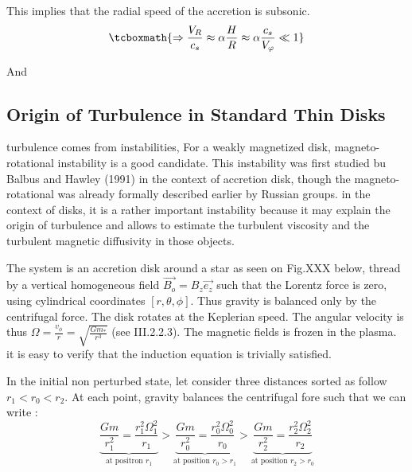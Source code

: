 \documentclass[10pt,a4paper,english]{article}
\begin{document}
This implies that the radial speed of the accretion is subsonic.
\begin{equation}
    \tcboxmath{
        \Rightarrow \frac{V_R}{c_s} \approx \alpha \frac{H}{R} \approx \alpha \frac{c_s}{V_\varphi} \ll 1
    }
\end{equation}

And %

\subsection{Origin of Turbulence in Standard Thin Disks}

turbulence comes from instabilities, For a weakly magnetized disk, magneto-rotational instability is a good candidate.
This instability was first studied bu Balbus and Hawley  (1991) in the context of accretion disk, though the
magneto-rotational was already formally described earlier by Russian groups. in the context of disks,
it is a rather important instability because it may explain the origin of turbulence and allows to estimate
the turbulent viscosity  and the turbulent magnetic diffusivity in those objects.


The system is an accretion disk around a star as seen on Fig.XXX below, thread by a vertical homogeneous field
$\vec{B_o} = B_z\vec{e_z}$ such that the Lorentz force is zero, using cylindrical coordinates $[r,\theta,\phi]$.
Thus gravity is balanced only by the centrifugal force. The disk rotates  at the Keplerian speed. The angular
velocity is thus $\Omega = \frac{v_{\phi}}{r} = \sqrt{\frac{Gm_*}{r^3}}$  (see III.2.2.3). The magnetic fields
is frozen  in the plasma. it is easy to verify that the induction equation is trivially satisfied.


In the initial non perturbed state, let consider three distances sorted as follow $r_1 < r_0 < r_2 $. At
each point, gravity balances the centrifugal fore  such that we can write :
\begin{equation}
    \underbrace{\frac{Gm}{r_1^2} = \frac{r_1^2\Omega_1^2}{r_1}}_{\text{at positron  } r_1} >
    \underbrace{\frac{Gm}{r_0^2} = \frac{r_0^2\Omega_0^2}{r_0}}_{\text{at position }r_0 > r_1}	>
    \underbrace{\frac{Gm}{r_2^2} = \frac{r_2^2\Omega_2^2}{r_2}}_{\text{at position }r_2 > r_0}
\end{equation}
\end{document}
